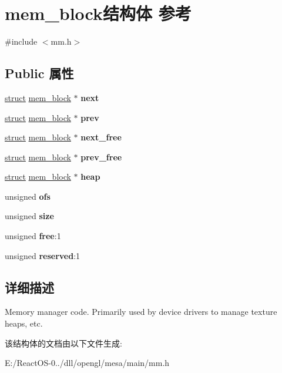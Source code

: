 \hypertarget{structmem__block}{}\section{mem\+\_\+block结构体 参考}
\label{structmem__block}


{\ttfamily \#include $<$mm.\+h$>$}

\subsection*{Public 属性}
\begin{DoxyCompactItemize}
\item 
\mbox{\label{structmem__block_a6bc667eb00ed1bb2d18b4074a69d7cf4}} 
\hyperlink{interfacestruct}{struct} \hyperlink{structmem__block}{mem\+\_\+block} $\ast$ {\bfseries next}
\item 
\mbox{\label{structmem__block_aa90f4c704cf76f9b88cd2e4581e6f456}} 
\hyperlink{interfacestruct}{struct} \hyperlink{structmem__block}{mem\+\_\+block} $\ast$ {\bfseries prev}
\item 
\mbox{\label{structmem__block_a38467c1e816c3dfa2aa1c8956f42eb2f}} 
\hyperlink{interfacestruct}{struct} \hyperlink{structmem__block}{mem\+\_\+block} $\ast$ {\bfseries next\+\_\+free}
\item 
\mbox{\label{structmem__block_a4d304747fd9c7e939a7d28cdc3402fcb}} 
\hyperlink{interfacestruct}{struct} \hyperlink{structmem__block}{mem\+\_\+block} $\ast$ {\bfseries prev\+\_\+free}
\item 
\mbox{\label{structmem__block_a3452e38ba19807fa3d9c52086aeb29e9}} 
\hyperlink{interfacestruct}{struct} \hyperlink{structmem__block}{mem\+\_\+block} $\ast$ {\bfseries heap}
\item 
\mbox{\label{structmem__block_ae6746571c28388a69eee0ea3234e357b}} 
unsigned {\bfseries ofs}
\item 
\mbox{\label{structmem__block_aa5518d0166a05673624b288ea416a382}} 
unsigned {\bfseries size}
\item 
\mbox{\label{structmem__block_a028ef140ea24c8d8df1e3b638b589194}} 
unsigned {\bfseries free}\+:1
\item 
\mbox{\label{structmem__block_a43dc118ab7f704267858210fabdb288e}} 
unsigned {\bfseries reserved}\+:1
\end{DoxyCompactItemize}


\subsection{详细描述}
Memory manager code. Primarily used by device drivers to manage texture heaps, etc. 

该结构体的文档由以下文件生成\+:\begin{DoxyCompactItemize}
\item 
E\+:/\+React\+O\+S-\/0../dll/opengl/mesa/main/mm.\+h\end{DoxyCompactItemize}
